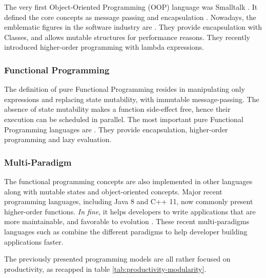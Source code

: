 
The very first Object-Oriented Programming (OOP) language was Small\-talk \cite{Goldberg1984}.
It defined the core concepts as message passing and encapsulation %
.
Nowadays, the emblematic figures in the software industry are .
They provide encapsulation with Classes, and allows mutable structures for performance reasons.
They recently introduced higher-order programming with lambda expressions.

\subsubsection{Functional Programming} \label{chapter3:software-productivity:programming-models:functional-programming}


The definition of pure Functional Programming resides in manipulating only expressions and replacing state mutability, with immutable message-passing.
The absence of state mutability makes a function side-effect free, hence their execution can be scheduled in parallel.
The most important pure Functional Programming languages are .
They provide encapsulation, higher-order programming and lazy evaluation.

\subsubsection{Multi-Paradigm}

The functional programming concepts are also implemented in other languages along with mutable states and object-oriented concepts.
Major recent programming languages, including Java 8 and C++ 11, now commonly present higher-order functions.
\textit{In fine}, it helps developers to write applications that are more maintainable, and favorable to evolution \cite{Hughes1989,Turner1981}.
These recent multi-paradigms languages such as  combine the different paradigms to help developer building applications faster.

\separator

The previously presented programming models are all rather focused on productivity, as recapped in table \ref{tab:productivity-modularity}.


